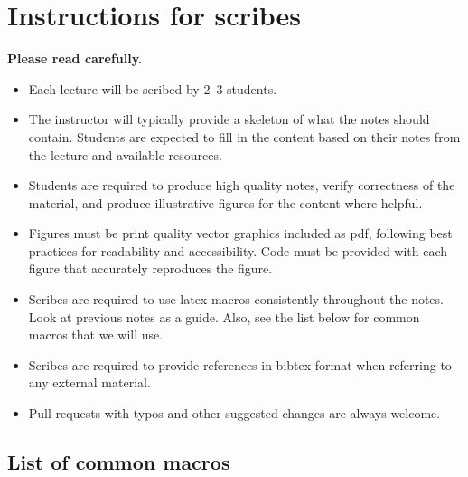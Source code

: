 \documentclass[12pt]{article}
\begin{document}

\maketitle

\section*{Instructions for scribes}

{\bf\color{red} Please read carefully.}

\begin{itemize}
\item Each lecture will be scribed by 2--3 students. 
\item The instructor will typically provide a skeleton of what the notes should contain. Students are expected to fill in the content based on their notes from the lecture and available resources.
\item Students are required to produce high quality notes, verify correctness of the material, and produce illustrative figures for the content where helpful. 
\item Figures must be print quality vector graphics included as pdf, following best practices for readability and accessibility. Code must be provided with each figure that accurately reproduces the figure.
\item Scribes are required to use latex macros consistently throughout the notes. Look at previous notes as a guide. Also, see the list below for common macros that we will use.
\item Scribes are required to provide references in bibtex format when referring to any external material.
\item Pull requests with typos and other suggested changes are always welcome.
\end{itemize}

\subsection*{List of common macros}
\end{document}
